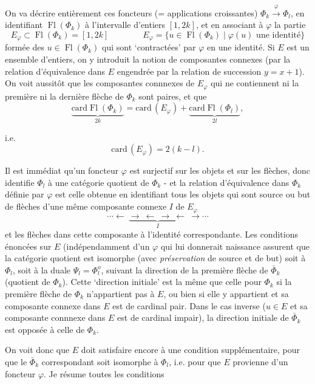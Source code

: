 \documentclass[11pt]{article}
\newcommand{\printedpage}[1]{\marginpar{\footnotesize p.~#1}}
\newcommand{\msp}[1]{\marginpar{\footnotesize [#1]}}
\newcommand{\Fl}{\operatorname{Fl}}
\newcommand{\card}{\mathrm{card}}
\begin{document}
On va décrire entièrement ces foncteurs (= applications croissantes) $\Phi_k\xrightarrow{\varphi}\Phi_l$, en identifiant $\Fl(\Phi_k)$ à l'intervalle d'entiers $[1,2k]$, et en associant à $\varphi$ la partie
\[
E_\varphi\subset\Fl(\Phi_k)=[1,2k]\qquad\qquad E_\varphi=\{u\in\Fl(\Phi_k)\mid\varphi(u)\text{ une identité}\}
\]
formée des $u\in\Fl(\Phi_k)$ qui sont `contractées' par $\varphi$ en une identité. Si $E$ est un ensemble d'entiers, on y introduit la notion de composantes connexes (par la relation d'équivalence dans $E$ engendrée par la relation de succession $y=x+1$). On voit aussitôt que les composantes connnexes de $E_\varphi$ qui ne contiennent ni la première ni la dernière flèche de $\Phi_k$ sont paires, et que %
\[
\underbrace{\card\Fl(\Phi_k)}_{2k}=\card\,(E_\varphi)+\underbrace{\card\Fl(\Phi_l)}_{2l},
\]

\msp{page 18}
i.e.
\[
\card\,(E_\varphi)=2(k-l).
\]


\printedpage{12}

Il est immédiat qu'un foncteur $\varphi$ est surjectif sur les objets et sur les flèches, donc identifie $\Phi_l$ à une catégorie quotient de $\Phi_k$ - et la relation d'équivalence dans $\Phi_k$ définie par $\varphi$ est celle obtenue en identifiant tous les objets qui sont source ou but de flèches d'une même composante connexe $I$ de $E_\varphi$
\[
\cdots\longleftarrow\ \underbrace{\longrightarrow\ \longleftarrow\ \longrightarrow\ \longleftarrow}_{I}\ \longrightarrow\cdots
\]
et les flèches dans cette composante à l'identité correspondante. Les conditions énoncées sur $E$ (indépendamment d'un $\varphi$ qui lui donnerait naissance assurent que la catégorie quotient est isomorphe (avec \textit{préservation} de source et de but) soit à $\Phi_l$, soit à la duale $\Psi_l=\Phi_l^o$, suivant la direction de la première flèche de $\bar{\Phi}_k$ (quotient de $\Phi_k$). Cette `direction initiale' est la même que celle pour $\Phi_k$ si la première flèche de $\Phi_k$ n'appartient pas à $E$, ou bien si elle y appartient et sa composante connexe dans $E$ est de cardinal pair. Dans le cas inverse ($u\in E$ et sa composante connnexe dans $E$ est de cardinal impair), la direction initiale de $\bar{\Phi}_k$ est opposée à celle de $\Phi_k$. %

\msp{page 19}
On voit donc que $E$ doit satisfaire encore à une condition supplémentaire, pour que le $\bar{\Phi}_k$ correspondant soit isomorphe à $\Phi_l$, i.e. pour que $E$ provienne d'un foncteur $\varphi$. Je résume toutes les conditions
\end{document}
